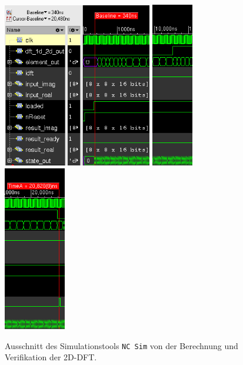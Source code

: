  \begin{figure}[htbp]
  \centering
  \includegraphics[width=0.58\textwidth]{img/Simulationsdauer_Anfang.png}
  \hfill
  \includegraphics[width=0.161\textwidth]{img/Simulationsdauer_Mitte.png}
  \hfill
  \includegraphics[width=0.241\textwidth]{img/Simulationsdauer_Ende.png}
  \caption{Ausschnitt des Simulationstools \texttt{NC\,Sim} von der Berechnung und Verifikation der 2D-DFT.}
  \label{pic:Simulationsdauer}
 \end{figure}

